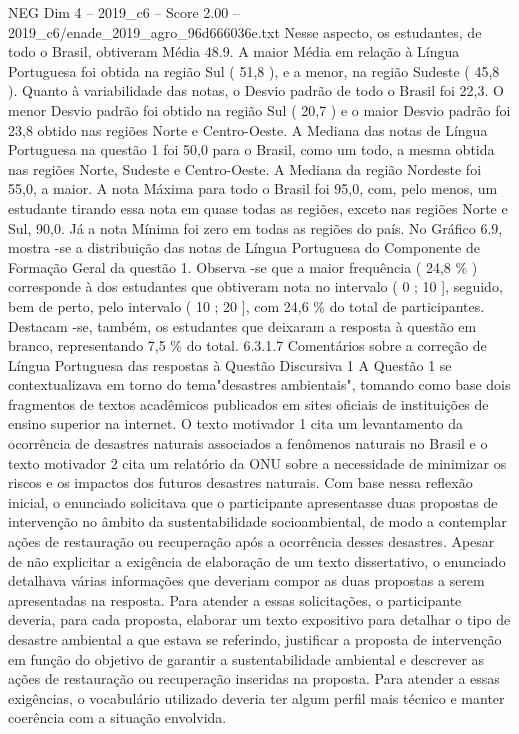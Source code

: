 \begin{textsample}{NEG Dim 4 – 2019\_c6 – Score 2.00 – 2019\_c6/enade\_2019\_agro\_96d666036e.txt}
Nesse aspecto, os estudantes, de todo o Brasil, obtiveram Média 48.9.
A maior Média em relação à Língua Portuguesa foi obtida na região Sul ( 51,8 ), e a menor, na região Sudeste ( 45,8 ).
Quanto à variabilidade das notas, o Desvio padrão de todo o Brasil foi 22,3.
O menor Desvio padrão foi obtido na região Sul ( 20,7 ) e o maior Desvio padrão foi 23,8 obtido nas regiões Norte e Centro-Oeste.
A Mediana das notas de Língua Portuguesa na questão 1 foi 50,0 para o Brasil, como um todo, a mesma obtida nas regiões Norte, Sudeste e Centro-Oeste.
A Mediana da região Nordeste foi 55,0, a maior.
A nota Máxima para todo o Brasil foi 95,0, com, pelo menos, um estudante tirando essa nota em quase todas as regiões, exceto nas regiões Norte e Sul, 90,0.
Já a nota Mínima foi zero em todas as regiões do país.
No Gráfico 6.9, mostra -se a distribuição das notas de Língua Portuguesa do Componente de Formação Geral da questão 1.
Observa -se que a maior frequência ( 24,8 \% ) corresponde à dos estudantes que obtiveram nota no intervalo ( 0 ; 10 ], seguido, bem de perto, pelo intervalo ( 10 ; 20 ], com 24,6 \% do total de participantes.
Destacam -se, também, os estudantes que deixaram a resposta à questão em branco, representando 7,5 \% do total. 6.3.1.7 Comentários sobre a correção de Língua Portuguesa das respostas à Questão Discursiva 1 A Questão 1 se contextualizava em torno do tema"desastres ambientais", tomando como base dois fragmentos de textos acadêmicos publicados em sites oficiais de instituições de ensino superior na internet.
O texto motivador 1 cita um levantamento da ocorrência de desastres naturais associados a fenômenos naturais no Brasil e o texto motivador 2 cita um relatório da ONU sobre a necessidade de minimizar os riscos e os impactos dos futuros desastres naturais.
Com base nessa reflexão inicial, o enunciado solicitava que o participante apresentasse duas propostas de intervenção no âmbito da sustentabilidade socioambiental, de modo a contemplar ações de restauração ou recuperação após a ocorrência desses desastres.
Apesar de não explicitar a exigência de elaboração de um texto dissertativo, o enunciado detalhava várias informações que deveriam compor as duas propostas a serem apresentadas na resposta.
Para atender a essas solicitações, o participante deveria, para cada proposta, elaborar um texto expositivo para detalhar o tipo de desastre ambiental a que estava se referindo, justificar a proposta de intervenção em função do objetivo de garantir a sustentabilidade ambiental e descrever as ações de restauração ou recuperação inseridas na proposta.
Para atender a essas exigências, o vocabulário utilizado deveria ter algum perfil mais técnico e manter coerência com a situação envolvida.

\end{textsample}
